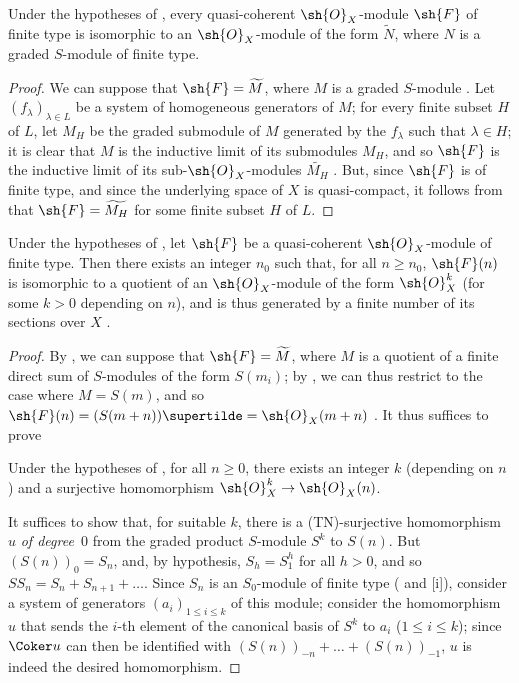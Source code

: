 \begin{corollary}[2.7.8]
\label{II.2.7.8}
Under the hypotheses of , every quasi-coherent $\sh{O}_X$-module $\sh{F}$ of finite type is isomorphic to an $\sh{O}_X$-module of the form $\widetilde{N}$, where $N$ is a graded $S$-module of finite type.
\end{corollary}

\begin{proof}
We can suppose that $\sh{F}=\widetilde{M}$, where $M$ is a graded $S$-module .
Let $(f_\lambda)_{\lambda\in L}$ be a system of homogeneous generators of $M$;
for every finite subset $H$ of $L$, let $M_H$ be the graded submodule of $M$ generated by the $f_\lambda$ such that $\lambda\in H$;
it is clear that $M$ is the inductive limit of its submodules $M_H$, and so $\sh{F}$ is the inductive limit of its sub-$\sh{O}_X$-modules $\widetilde{M_H}$ .
But, since $\sh{F}$ is of finite type, and since the underlying space of $X$ is quasi-compact, it follows from  that $\sh{F}=\widetilde{M_H}$ for some finite subset $H$ of $L$.
\end{proof}

\begin{corollary}[2.7.9]
\label{II.2.7.9}
Under the hypotheses of , let $\sh{F}$ be a quasi-coherent $\sh{O}_X$-module of finite type.
Then there exists an integer $n_0$ such that, for all $n\geq n_0$, $\sh{F}(n)$ is isomorphic to a quotient of an $\sh{O}_X$-module of the form $\sh{O}_X^k$ (for some $k>0$ depending on $n$), and is thus generated by a finite number of its sections over $X$ .
\end{corollary}

\begin{proof}
By , we can suppose that $\sh{F}=\widetilde{M}$, where $M$ is a quotient of a finite direct sum of $S$-modules of the form $S(m_i)$;
by , we can thus restrict to the case where $M=S(m)$, and so $\sh{F}(n)=(S(m+n))\supertilde=\sh{O}_X(m+n)$ .
It thus suffices to prove

  \begin{lemma}[2.7.9.1]
  \label{II.2.7.9.1}
  Under the hypotheses of , for all $n\geq0$, there exists an integer $k$ (depending on $n$) and a surjective homomorphism $\sh{O}_X^k\to\sh{O}_X(n)$.
  \end{lemma}

It suffices  to show that, for suitable $k$, there is a (TN)-surjective homomorphism $u$ \emph{of degree~$0$} from the graded product $S$-module $S^k$ to $S(n)$.
But $(S(n))_0=S_n$, and, by hypothesis, $S_h=S_1^h$ for all $h>0$, and so $SS_n=S_n+S_{n+1}+\ldots$.
Since $S_n$ is an $S_0$-module of finite type ( and [i]), consider a system of generators $(a_i)_{1\leq i\leq k}$ of this module;
consider the homomorphism $u$ that sends the $i$-th element of the canonical basis of $S^k$ to $a_i$ ($1\leq i\leq k$);
since $\Coker u$ can then be identified with $(S(n))_{-n}+\ldots+(S(n))_{-1}$, $u$ is indeed the desired homomorphism.
\end{proof}

